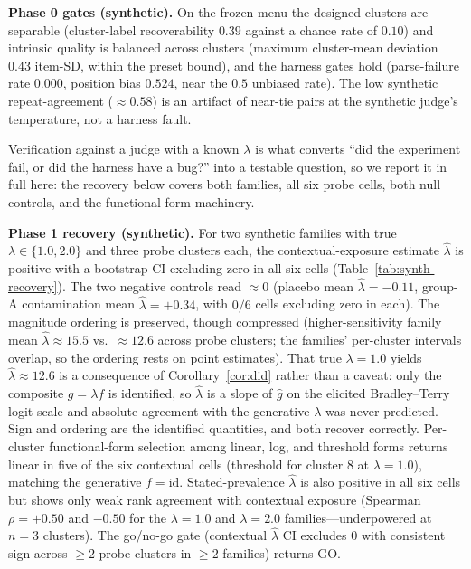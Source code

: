 ﻿\documentclass[11pt]{article}
\begin{document}
\textbf{Phase 0 gates (synthetic).} On the frozen menu the designed clusters are separable (cluster-label recoverability \(0.39\) against a chance rate of \(0.10\)) and intrinsic quality is balanced across clusters (maximum cluster-mean deviation \(0.43\) item-SD, within the preset bound), and the harness gates hold (parse-failure rate \(0.000\), position bias \(0.524\), near the \(0.5\) unbiased rate). The low synthetic repeat-agreement (\(\approx 0.58\)) is an artifact of near-tie pairs at the synthetic judge's temperature, not a harness fault.

Verification against a judge with a known \(\lambda\) is what converts ``did the experiment fail, or did the harness have a bug?'' into a testable question, so we report it in full here: the recovery below covers both families, all six probe cells, both null controls, and the functional-form machinery.

\textbf{Phase 1 recovery (synthetic).} For two synthetic families with true \(\lambda \in \{1.0, 2.0\}\) and three probe clusters each, the contextual-exposure estimate \(\hat\lambda\) is positive with a bootstrap CI excluding zero in all six cells (Table~\ref{tab:synth-recovery}). The two negative controls read \(\approx 0\) (placebo mean \(\hat\lambda = -0.11\), group-A contamination mean \(\hat\lambda = +0.34\), with \(0/6\) cells excluding zero in each). The magnitude ordering is preserved, though compressed (higher-sensitivity family mean \(\hat\lambda \approx 15.5\) vs.\ \(\approx 12.6\) across probe clusters; the families' per-cluster intervals overlap, so the ordering rests on point estimates). That true \(\lambda = 1.0\) yields \(\hat\lambda \approx 12.6\) is a consequence of Corollary~\ref{cor:did} rather than a caveat: only the composite \(g = \lambda f\) is identified, so \(\hat\lambda\) is a slope of \(\hat g\) on the elicited Bradley--Terry logit scale and absolute agreement with the generative \(\lambda\) was never predicted. Sign and ordering are the identified quantities, and both recover correctly. Per-cluster functional-form selection among linear, log, and threshold forms returns linear in five of the six contextual cells (threshold for cluster 8 at \(\lambda = 1.0\)), matching the generative \(f = \mathrm{id}\). Stated-prevalence \(\hat\lambda\) is also positive in all six cells but shows only weak rank agreement with contextual exposure (Spearman \(\rho = +0.50\) and \(-0.50\) for the \(\lambda = 1.0\) and \(\lambda = 2.0\) families---underpowered at \(n = 3\) clusters). The go/no-go gate (contextual \(\hat\lambda\) CI excludes 0 with consistent sign across \(\geq 2\) probe clusters in \(\geq 2\) families) returns GO.
\end{document}
